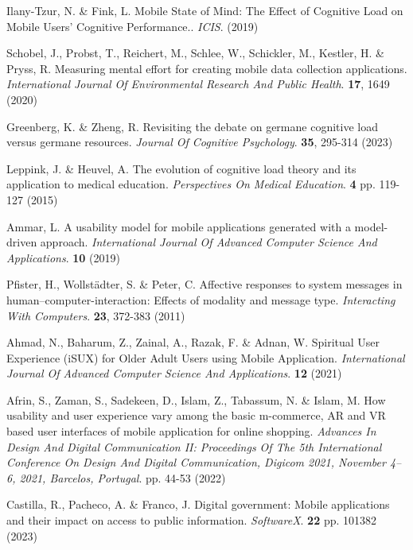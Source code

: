 \documentclass[preprint,12pt]{elsarticle}
\begin{document}
\begin{thebibliography}{99}
Ilany-Tzur, N. \& Fink, L. Mobile State of Mind: The Effect of Cognitive Load on Mobile Users' Cognitive Performance.. {\em ICIS}. (2019)

Schobel, J., Probst, T., Reichert, M., Schlee, W., Schickler, M., Kestler, H. \& Pryss, R. Measuring mental effort for creating mobile data collection applications. {\em International Journal Of Environmental Research And Public Health}. \textbf{17}, 1649 (2020)

Greenberg, K. \& Zheng, R. Revisiting the debate on germane cognitive load versus germane resources. {\em Journal Of Cognitive Psychology}. \textbf{35}, 295-314 (2023)

Leppink, J. \& Heuvel, A. The evolution of cognitive load theory and its application to medical education. {\em Perspectives On Medical Education}. \textbf{4} pp. 119-127 (2015)

Ammar, L. A usability model for mobile applications generated with a model-driven approach. {\em International Journal Of Advanced Computer Science And Applications}. \textbf{10} (2019)

Pfister, H., Wollstädter, S. \& Peter, C. Affective responses to system messages in human–computer-interaction: Effects of modality and message type. {\em Interacting With Computers}. \textbf{23}, 372-383 (2011)

Ahmad, N., Baharum, Z., Zainal, A., Razak, F. \& Adnan, W. Spiritual User Experience (iSUX) for Older Adult Users using Mobile Application. {\em International Journal Of Advanced Computer Science And Applications}. \textbf{12} (2021)

Afrin, S., Zaman, S., Sadekeen, D., Islam, Z., Tabassum, N. \& Islam, M. How usability and user experience vary among the basic m-commerce, AR and VR based user interfaces of mobile application for online shopping. {\em Advances In Design And Digital Communication II: Proceedings Of The 5th International Conference On Design And Digital Communication, Digicom 2021, November 4–6, 2021, Barcelos, Portugal}. pp. 44-53 (2022)

Castilla, R., Pacheco, A. \& Franco, J. Digital government: Mobile applications and their impact on access to public information. {\em SoftwareX}. \textbf{22} pp. 101382 (2023)


\end{thebibliography}
\end{document}
